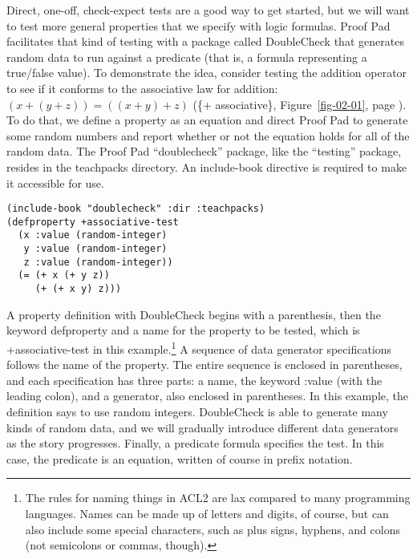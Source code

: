 Direct, one-off, \textsf{check-expect} tests
are a good way to get started, but
we will want to test more general properties that we specify with logic formulas.
Proof Pad facilitates that kind of testing
with a package called
DoubleCheck
that generates
random data
to run against a predicate
(that is, a formula representing a true/false value).
To demonstrate the idea, consider testing the addition operator to see if
it conforms to the associative law for addition: $(x + (y + z)) = ((x + y) + z)$
(\{+ associative\}, Figure~\ref{fig-02-01}, page \pageref{fig-02-01}).
To do that, we define a property as an equation
and direct Proof Pad to generate some random numbers and
report whether or not the equation holds for all of the random data.
The Proof Pad ``doublecheck'' package,
like the ``testing'' package,
resides in the
teachpacks directory.
An \textsf{include-book} directive is required to make it accessible for use.

\begin{Verbatim}
(include-book "doublecheck" :dir :teachpacks)
(defproperty +associative-test
  (x :value (random-integer)
   y :value (random-integer)
   z :value (random-integer))
  (= (+ x (+ y z))
     (+ (+ x y) z)))
\end{Verbatim}

A property definition with
DoubleCheck begins with a parenthesis, then the keyword
\textsf{defproperty}
and a name for the property to be tested,
which is \textsf{+associative-test} in this example.\footnote{The
rules for naming things in ACL2 are lax compared to many
programming languages. Names can be made up of letters and digits, of course,
but can also include some special characters,
such as plus signs, hyphens, and colons (not semicolons or commas, though).}
A sequence of data generator specifications follows the name of the property.
The entire sequence is enclosed in parentheses,
and each specification has three parts: a name,
the keyword \textsf{:value} (with the leading colon),
and a generator, also enclosed in parentheses.
In this example, the definition says to use random integers.
DoubleCheck is able to generate many kinds of random data,
and we will gradually introduce different data generators as the story progresses.
Finally, a predicate formula specifies the test.
In this case, the predicate is an equation,
written of course in prefix notation.

